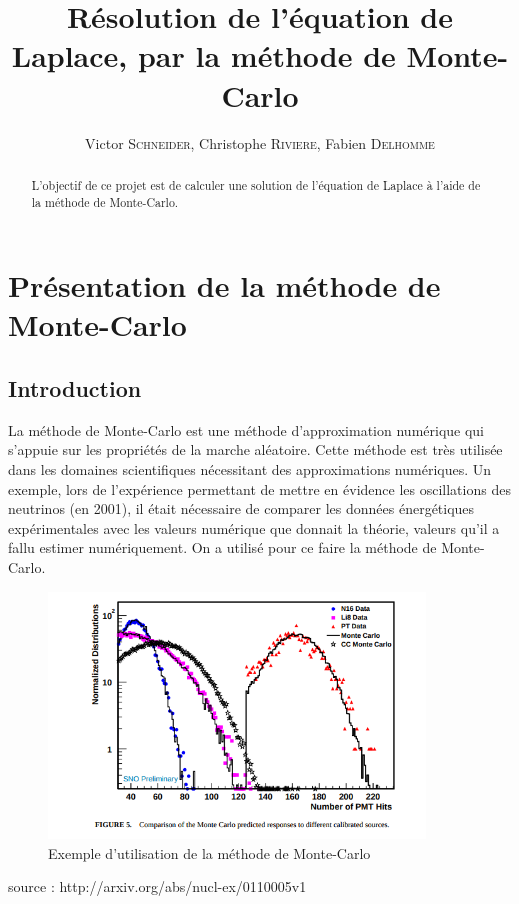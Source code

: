 \documentclass[11pt, a4paper]{article}
\title{Résolution de l'équation de Laplace, par la méthode de Monte-Carlo}
\author{Victor \textsc{Schneider}, Christophe \textsc{Riviere}, Fabien \textsc{Delhomme}}
\begin{document}
\maketitle
\begin{abstract}
    L'objectif de ce projet est de calculer une solution de l'équation de Laplace à l'aide de la
    méthode de Monte-Carlo.
\end{abstract}


\section{Présentation de la méthode de Monte-Carlo}

\subsection{Introduction}

La méthode de Monte-Carlo est une méthode d'approximation numérique qui s'appuie sur les propriétés
de la marche aléatoire.
\smallbreak
Cette méthode est très utilisée dans les domaines scientifiques nécessitant des approximations
numériques. Un exemple, lors de l'expérience permettant de mettre en évidence les oscillations des
neutrinos (en 2001), il était nécessaire de comparer les données énergétiques expérimentales avec
les valeurs numérique que donnait la théorie, valeurs qu'il a fallu estimer numériquement. On a
utilisé pour ce faire la méthode de Monte-Carlo.

\begin{figure}
    \centering \includegraphics[width=10cm]{exMC}
    \caption{Exemple d'utilisation de la méthode de Monte-Carlo}
\end{figure}

source : http://arxiv.org/abs/nucl-ex/0110005v1 %
\end{document}
